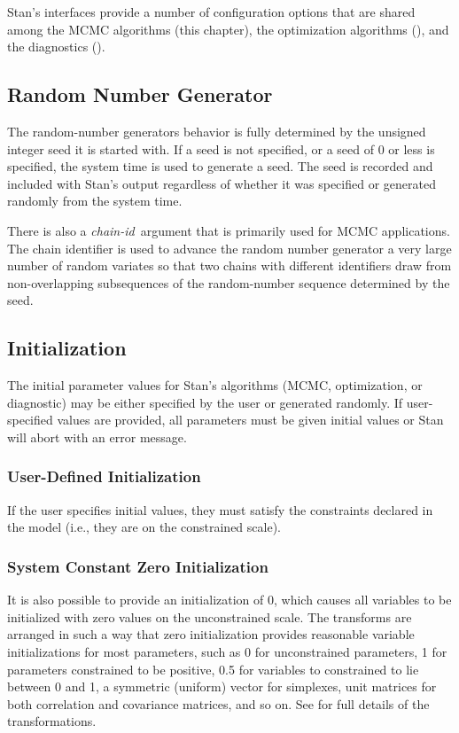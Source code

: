 Stan's interfaces provide a number of configuration options that are
shared among the MCMC algorithms (this chapter), the optimization
algorithms (), and the diagnostics
(). 

\subsection{Random Number Generator}

The random-number generators behavior is fully determined by the
unsigned integer seed it is started with.  If a seed is not specified,
or a seed of 0 or less is specified, the system time is used to
generate a seed.   The seed is recorded and included with Stan's
output regardless of whether it was specified or generated randomly
from the system time.

There is also a {\it chain-id}\, argument that is primarily used for MCMC
applications.  The chain identifier is used to advance the random
number generator a very large number of random variates so that two
chains with different identifiers draw from non-overlapping
subsequences of the random-number sequence determined by the seed.

\subsection{Initialization}

The initial parameter values for Stan's algorithms (MCMC,
optimization, or diagnostic) may be either specified by the user or
generated randomly. If user-specified values are provided, all
parameters must be given initial values or Stan will abort with an
error message.

\subsubsection{User-Defined Initialization}

If the user specifies initial values, they must satisfy the
constraints declared in the model (i.e., they are on the constrained
scale).

\subsubsection{System Constant Zero Initialization}

It is also possible to provide an initialization of 0, which causes
all variables to be initialized with zero values on the unconstrained
scale. The transforms are arranged in such a way that zero
initialization provides reasonable variable initializations for most
parameters, such as 0 for unconstrained parameters, 1 for parameters
constrained to be positive, 0.5 for variables to constrained to lie
between 0 and 1, a symmetric (uniform) vector for simplexes, unit
matrices for both correlation and covariance matrices, and so on. See
 for full details of the
transformations.



